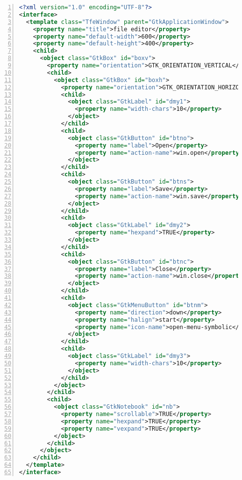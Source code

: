 \begin{lstlisting}[language=XML, numbers=left]
<?xml version="1.0" encoding="UTF-8"?>
<interface>
  <template class="TfeWindow" parent="GtkApplicationWindow">
    <property name="title">file editor</property>
    <property name="default-width">600</property>
    <property name="default-height">400</property>
    <child>
      <object class="GtkBox" id="boxv">
        <property name="orientation">GTK_ORIENTATION_VERTICAL</property>
        <child>
          <object class="GtkBox" id="boxh">
            <property name="orientation">GTK_ORIENTATION_HORIZONTAL</property>
            <child>
              <object class="GtkLabel" id="dmy1">
                <property name="width-chars">10</property>
              </object>
            </child>
            <child>
              <object class="GtkButton" id="btno">
                <property name="label">Open</property>
                <property name="action-name">win.open</property>
              </object>
            </child>
            <child>
              <object class="GtkButton" id="btns">
                <property name="label">Save</property>
                <property name="action-name">win.save</property>
              </object>
            </child>
            <child>
              <object class="GtkLabel" id="dmy2">
                <property name="hexpand">TRUE</property>
              </object>
            </child>
            <child>
              <object class="GtkButton" id="btnc">
                <property name="label">Close</property>
                <property name="action-name">win.close</property>
              </object>
            </child>
            <child>
              <object class="GtkMenuButton" id="btnm">
                <property name="direction">down</property>
                <property name="halign">start</property>
                <property name="icon-name">open-menu-symbolic</property>
              </object>
            </child>
            <child>
              <object class="GtkLabel" id="dmy3">
                <property name="width-chars">10</property>
              </object>
            </child>
          </object>
        </child>
        <child>
          <object class="GtkNotebook" id="nb">
            <property name="scrollable">TRUE</property>
            <property name="hexpand">TRUE</property>
            <property name="vexpand">TRUE</property>
          </object>
        </child>
      </object>
    </child>
  </template>
</interface>
\end{lstlisting}


